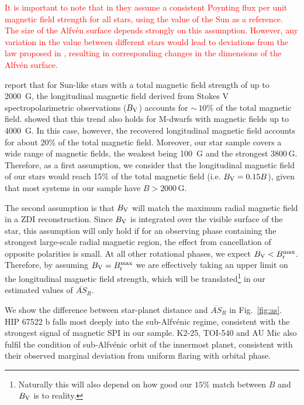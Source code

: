 \documentclass[twocolumn]{aastex631}
\begin{document}
\textcolor{red}{It is important to note that in \citet{chebly2023numerical} they assume a consistent Poynting flux per unit magnetic field strength for all stars, using the value of the Sun as a reference. The size of the Alfvén surface depends strongly on this assumption. However, any variation in the value between different stars would lead to deviations from the law proposed in \citet{chebly2023numerical}, resulting in corresponding changes in the dimensions of the Alfvén surface.
}


\citet{reiners2022magnetism} report that for Sun-like stars with a total magnetic field strength of up to 2000~G, the longitudinal magnetic field derived from Stokes V spectropolarimetric observations ($B_{\rm V}$) accounts for $\sim$\,$10$\% of the total magnetic field. \cite{kochukhov2020hidden} showed that this trend also holds for M-dwarfs with magnetic fields up to 4000~G. In this case, however, the recovered longitudinal magnetic field accounts for about $20\%$ of the total magnetic field. Moreover, our star sample covers a wide range of magnetic fields, the weakest being 100~G and the strongest $3800\,$G. Therefore, as a first assumption, we consider that the longitudinal magnetic field of our stars would reach 15\% of the total magnetic field (i.e. $B_{\rm V} = 0.15B$), given that most systems in our sample have $B>2000\,$G. 

The second assumption is that $B_{\rm V}$ will match the maximum radial magnetic field in a ZDI reconstruction. Since $B_{\rm V}$ is integrated over the visible surface of the star, this assumption will only hold if for an observing phase containing the strongest large-scale radial magnetic region, the effect from cancellation of opposite polarities is small. At all other rotational phases, we expect $B_{\rm V} < B_{\rm r}^{\rm max}$. Therefore, by assuming $B_{\rm V} = B_{\rm r}^{\rm max}$ we are effectively taking an upper limit on the longitudinal magnetic field strength, which will be translated\footnote[3]{Naturally this will also depend on how good our $15$\% match between $B$ and $B_{\rm V}$ is to reality.} in our estimated values of $\overline{AS}_{R}$.

We show the difference between star-planet distance and $\overline{AS}_{R}$ in Fig.~\ref{fig:as}. HIP 67522 b falls most deeply into the sub-Alfv\'enic regime, consistent with the strongest signal of magnetic SPI in our sample. K2-25, TOI-540 and AU Mic also fulfil the condition of sub-Alfv\'enic orbit of the innermost planet, consistent with their observed marginal deviation from uniform flaring with orbital phase. 
\end{document}
